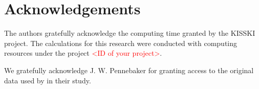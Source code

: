 \section{Acknowledgements}

The authors gratefully acknowledge the computing time granted by the KISSKI project. 
The calculations for this research were conducted with computing resources under the project \textcolor{red}{<ID of your project>}.

We gratefully acknowledge J. W. Pennebaker for granting access to the original data used by \citet{koppel_determining_2014} in their study. 